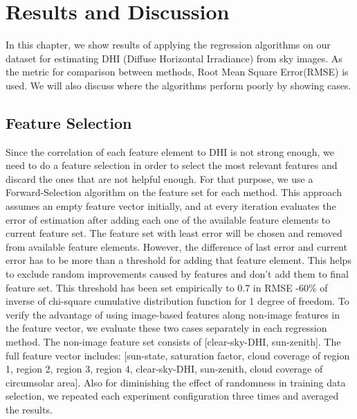 \chapter{Results and Discussion}
\label{sec:result_chapter}
In this chapter, we show results of applying the regression algorithms on our dataset for estimating DHI (Diffuse Horizontal Irradiance) from sky images. As the metric for comparison between methods, Root Mean Square Error(RMSE) is used. We will also discuss where the algorithms perform poorly by showing cases.

\section{Feature Selection}
Since the correlation of each feature element to DHI is not strong enough, we need to do a feature selection in order to select the most relevant features and discard the ones that are not helpful enough. For that purpose, we use a Forward-Selection algorithm on the feature set for each method. This approach assumes an empty feature vector initially, and at every iteration evaluates the error of estimation after adding each one of the available feature elements to current feature set. The feature set with least error will be chosen and removed from available feature elements. However, the difference of last error and current error has to be more than a threshold for adding that feature element. This helps to exclude random improvements caused by features and don't add them to final feature set. This threshold has been set empirically to 0.7 in RMSE -60\% of inverse of chi-square cumulative distribution function for 1 degree of freedom. To verify the advantage of using image-based features along non-image features in the feature vector, we evaluate these two cases separately in each regression method. The non-image feature set consists of [clear-sky-DHI, sun-zenith]. The full feature vector includes: [sun-state, saturation factor, cloud coverage of region 1, region 2, region 3, region 4, clear-sky-DHI, sun-zenith, cloud coverage of circumsolar area]. Also for diminishing the effect of randomness in training data selection, we repeated each experiment configuration three times and averaged the results.

